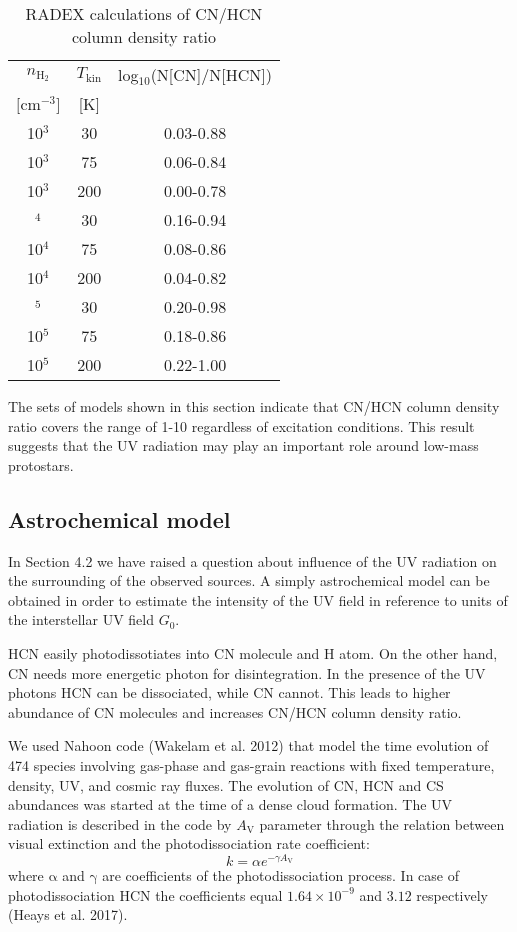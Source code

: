\documentclass{aa}
\begin{document}
\begin{table}
\caption{RADEX calculations of CN/HCN column density ratio}             %
\label{table:5}      %
\centering                          %
\begin{tabular}{c c c} 
\hline\hline  
$n_\mathrm{H_2}$ & $T_\mathrm{kin}$ & log$_{10}$(N[CN]/N[HCN]) \\
$[$cm$^{-3}]$ & [K] & \\
\hline
10$^{3}$ & 30 & 0.03-0.88\\
10$^{3}$ & 75 & 0.06-0.84\\
10$^{3}$ & 200 & 0.00-0.78\\ \hdashline
10$^{4}$ & 30 & 0.16-0.94\\
10$^{4}$ & 75 & 0.08-0.86\\
10$^{4}$ & 200 & 0.04-0.82\\ \hdashline
10$^{5}$ & 30 & 0.20-0.98\\
10$^{5}$ & 75 & 0.18-0.86\\
10$^{5}$ & 200 & 0.22-1.00\\ \hline
\end{tabular}
\end{table} 

The sets of models shown in this section indicate that CN/HCN column density ratio covers the range of 1-10 regardless of excitation conditions. This result suggests that the UV radiation may play an important role around low-mass protostars. 

\subsection{Astrochemical model}
In Section 4.2 we have raised a question about influence of the UV radiation on the surrounding of the observed sources. A simply astrochemical model can be obtained in order to estimate the intensity of the UV field in reference to units of the interstellar UV field $G_0$.

HCN easily photodissotiates into CN molecule and H atom. On the other hand, CN needs more energetic photon for disintegration. In the presence of the UV photons HCN can be dissociated, while CN cannot. This leads to higher abundance of CN molecules and increases CN/HCN column density ratio.

We used Nahoon code (Wakelam et al. 2012) that model the time evolution of 474 species involving gas-phase and gas-grain reactions with fixed temperature, density, UV, and cosmic ray fluxes. The evolution of CN, HCN and CS abundances was started at the time of a dense cloud formation. The UV radiation is described in the code by $A_\mathrm{V}$ parameter through the relation between visual extinction and the photodissociation rate coefficient:
\begin{equation} \label{eq1}
k =  \alpha e^{-\gamma A_\mathrm{V}}
\end{equation}
where $\mathrm{\alpha}$ and $\mathrm{\gamma}$ are coefficients of the photodissociation process. In case of photodissociation HCN the coefficients equal $1.64\times10^{-9}$ and $3.12$ respectively (Heays et al. 2017). 
\end{document}
